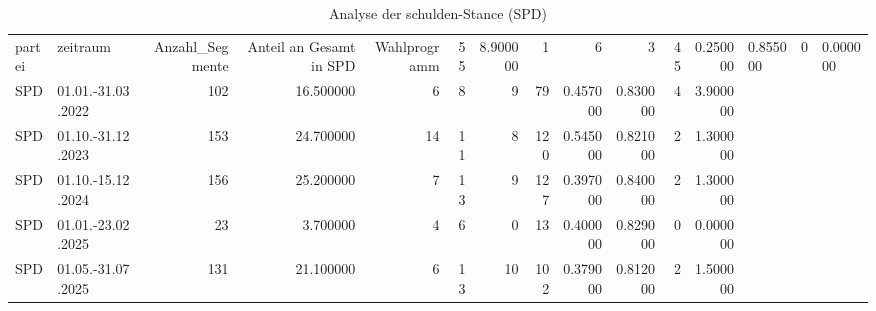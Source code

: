 \begin{table}
\caption{Analyse der schulden-Stance (SPD)}
\label{tab:meine_tabelle}
\begin{tabular}{llrrrrrrrrrr}
\toprule
partei & zeitraum & Anzahl_Segmente & Anteil an Gesamt in %
\midrule
SPD & Wahlprogramm & 55 & 8.900000 & 1 & 6 & 3 & 45 & 0.250000 & 0.855000 & 0 & 0.000000 \\
SPD & 01.01.-31.03.2022 & 102 & 16.500000 & 6 & 8 & 9 & 79 & 0.457000 & 0.830000 & 4 & 3.900000 \\
SPD & 01.10.-31.12.2023 & 153 & 24.700000 & 14 & 11 & 8 & 120 & 0.545000 & 0.821000 & 2 & 1.300000 \\
SPD & 01.10.-15.12.2024 & 156 & 25.200000 & 7 & 13 & 9 & 127 & 0.397000 & 0.840000 & 2 & 1.300000 \\
SPD & 01.01.-23.02.2025 & 23 & 3.700000 & 4 & 6 & 0 & 13 & 0.400000 & 0.829000 & 0 & 0.000000 \\
SPD & 01.05.-31.07.2025 & 131 & 21.100000 & 6 & 13 & 10 & 102 & 0.379000 & 0.812000 & 2 & 1.500000 \\
\bottomrule
\end{tabular}
\end{table}
